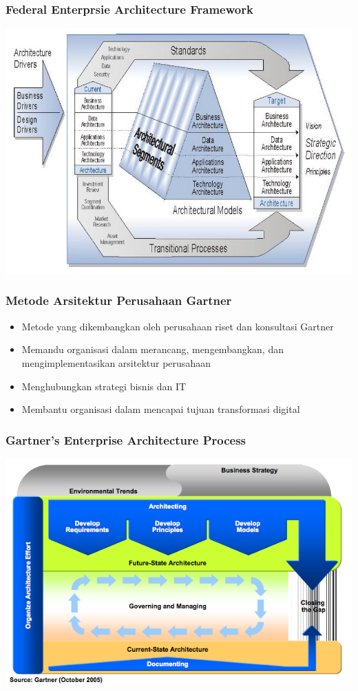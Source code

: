\documentclass{beamer}
\begin{document}
	{
		\begin{frame}
			\frametitle{Federal Enterprsie Architecture Framework}
			\begin{center}
				\includegraphics[width=.95\textwidth]{../figures/feaf}
			\end{center}
		\end{frame}
	}

	\begin{frame}
		\frametitle{Metode Arsitektur Perusahaan Gartner}
		\begin{itemize}
			\item Metode yang dikembangkan oleh perusahaan riset dan konsultasi Gartner
			\item Memandu organisasi dalam merancang, mengembangkan, dan mengimplementasikan arsitektur perusahaan
			\item Menghubungkan strategi bisnis dan IT
			\item Membantu organisasi dalam mencapai tujuan transformasi digital
		\end{itemize}
	\end{frame}
	
	{
		\begin{frame}
			\frametitle{Gartner's Enterprise Architecture Process}
			\begin{center}
				\includegraphics[width=.95\textwidth]{../figures/gartner}
			\end{center}
		\end{frame}
	}
\end{document}
